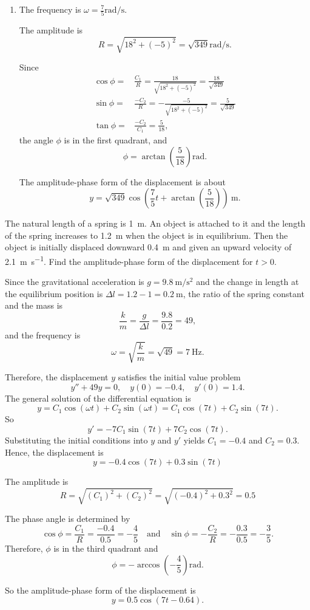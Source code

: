\begin{solution}
\begin{enumerate}
\item The frequency is $\omega=\frac{7}{5} \si{\radian\per\second}$.

The amplitude is
\[R=\sqrt{18^2+(-5)^2}=\sqrt{349} \si{\radian\per\second}.\]

Since 
\[
\begin{aligned}
  \cos\phi=&\frac{C_1}{R}=\frac{18}{\sqrt{18^2+(-5)^2}}=\frac{18}{\sqrt{349}}\\
  \sin\phi=&\frac{-C_2}{R}=-\frac{-5}{\sqrt{18^2+(-5)^2}}=\frac{5}{\sqrt{349}}\\
  \tan\phi=&\frac{-C_2}{C_1}=\frac{5}{18},
\end{aligned}  
\]
the angle $\phi$ is in the first quadrant, and 
\[\phi= \arctan\left(\frac{5}{18}\right) \si{\radian}.\]

The amplitude-phase form of the displacement is about
\[y=\sqrt{349}\cos\left(\frac75t + \arctan\left(\frac{5}{18}\right)\right)~\si{\meter}.\]
\end{enumerate}
\end{solution}

\begin{exercise}
  The natural length of a spring is \SI{1}{\meter}. An object is attached to it and the length of the spring increases to \SI{1.2}{\meter} when the object is in equilibrium. Then the object is initially displaced downward \SI{0.4}{\meter} and given an upward velocity of \SI{2.1}{\meter\per\second}. Find the amplitude-phase form of the displacement for $t>0$.
\end{exercise}
\begin{exersol}
Since the gravitational acceleration is $g=\SI{9.8}{\meter\per\square\second}$ and the change in length at the equilibrium position is $\Delta l=1.2-1=0.2~\si{\meter}$, the ratio of the spring constant and the mass is  
\[\frac{k}{m}=\frac{g}{\Delta l}=\frac{9.8}{0.2}=49,\]
and the frequency is
\[\omega=\sqrt{\frac{k}{m}}=\sqrt{49}=\SI{7}{\Hz}.\] 

Therefore, the displacement $y$ satisfies the initial value problem
\[y'' + 49y=0, \quad y(0)=-0.4,\quad y'(0)=1.4.\]
The general solution of the differential equation is
\[y=C_1\cos(\omega t)+C_2\sin(\omega t) = C_1\cos(7t)+C_2\sin(7t).\]
So
\[y'=-7C_1\sin(7t)+7C_2\cos(7t).\]
Substituting the initial conditions into $y$ and $y'$ yields $C_1=-0.4$ and $C_2=0.3$. Hence, the displacement is
\[y=-0.4\cos(7t)+0.3\sin(7t)\]

The amplitude is
\[R=\sqrt{\left(C_{1}\right)^{2}+\left(C_{2}\right)^{2}}=\sqrt{(-0.4)^2+0.3^2}=0.5\]

The phase angle is determined by
\[\cos\phi = \frac{C_{1}}{R}=\frac{-0.4}{0.5}=-\frac45\quad\text{and}\quad \sin\phi = -\frac{C_{2}}{R}=-\frac{0.3}{0.5}=-\frac35.\]
Therefore, $\phi$ is in the third quadrant and
\[\phi = -\arccos\left(-\frac45\right)\text{rad}.\]

So the amplitude-phase form of the displacement is
\[y=0.5\cos(7t-0.64).\]
\end{exersol}

